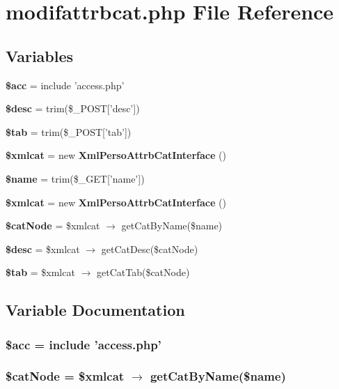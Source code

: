 \section{modifattrbcat.php File Reference}
\label{modifattrbcat_8php}


\subsection*{Variables}
\begin{CompactItemize}
\item 
{\bf \$acc} = include 'access.php'
\item 
{\bf \$desc} = trim(\$\_\-POST['desc'])
\item 
{\bf \$tab} = trim(\$\_\-POST['tab'])
\item 
{\bf \$xmlcat} = new {\bf Xml\-Perso\-Attrb\-Cat\-Interface} ()
\item 
{\bf \$name} = trim(\$\_\-GET['name'])
\item 
{\bf \$xmlcat} = new {\bf Xml\-Perso\-Attrb\-Cat\-Interface} ()
\item 
{\bf \$cat\-Node} = \$xmlcat $\rightarrow$ get\-Cat\-By\-Name(\$name)
\item 
{\bf \$desc} = \$xmlcat $\rightarrow$ get\-Cat\-Desc(\$cat\-Node)
\item 
{\bf \$tab} = \$xmlcat $\rightarrow$ get\-Cat\-Tab(\$cat\-Node)
\end{CompactItemize}


\subsection{Variable Documentation}
\subsubsection{\setlength{\rightskip}{0pt plus 5cm}\$acc = include 'access.php'}\label{modifattrbcat_8php_542926c588a05eb69553d79c83cf73da}


\subsubsection{\setlength{\rightskip}{0pt plus 5cm}\$cat\-Node = \$xmlcat $\rightarrow$ get\-Cat\-By\-Name(\$name)}\label{modifattrbcat_8php_6b6a3d0442eb8cc5ad00f6cca24e154f}


